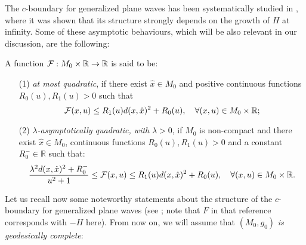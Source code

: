 The $c$-boundary for generalized plane waves has been systematically studied in \cite{Florescausalboundarywavetype2008}, where it was shown that its structure strongly depends on the growth of $H$ at infinity. Some of these asymptotic behaviours, which will be also relevant in our discussion, are the following:
\begin{definition} A function ${\cal F}:M_0\times{\mathbb R}\rightarrow {\mathbb R}$ is said to be:
\begin{itemize}
%
\item[(1)] {\em at most quadratic}, if there exist $\hat{x}\in M_0$ and positive continuous functions $R_0(u), R_1(u) > 0$ such that
\[
{\cal F}(x,u)\leq R_1(u)d(x,\hat{x})^2 + R_0(u),\quad\forall (x,u)\in M_0\times {\mathbb R};
\]
\item[(2)] {\em $\lambda$-asymptotically quadratic, with} $\lambda>0$, if $M_0$ is non-compact and there
exist $\hat{x}\in M_0$, continuous functions $R_0(u), R_1(u)>0$ and a constant $R_0^-\in {\mathbb R}$ such that:
\[
\frac{\lambda^2d(x,\hat{x})^2+R_0^-}{u^2+1}\leq {\cal F}(x,u)\leq R_1(u)d(x,\hat{x})^2 + R_0(u),\quad\forall (x,u)\in M_0\times {\mathbb R}.
\]
\end{itemize}
\end{definition}
Let us recall now some noteworthy statements about the structure of the $c$-boundary for generalized plane waves (see \cite[Theorems 7.9 and 8.2]{Florescausalboundarywavetype2008}; note that $F$ in that reference corresponds with $-H$ here). From now on, we will assume that $(M_0,g_0)$ {\em is geodesically complete}:

